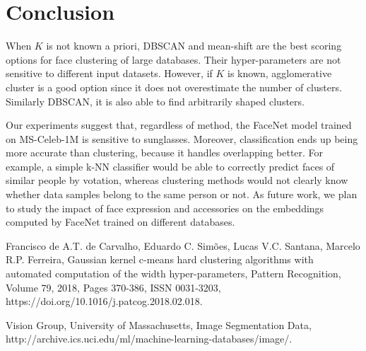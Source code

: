 \documentclass[conference]{IEEEtran}
\begin{document}
\section{Conclusion}

When $K$ is not known a priori, DBSCAN and mean-shift are the best scoring options for face clustering of large databases.
Their hyper-parameters are not sensitive to different input datasets.
However, if $K$ is known, agglomerative cluster is a good option since it does not overestimate the number of clusters.
Similarly DBSCAN, it is also able to find arbitrarily shaped clusters.

Our experiments suggest that, regardless of method, the FaceNet model trained on MS-Celeb-1M is sensitive to sunglasses.
Moreover, classification ends up being more accurate than clustering, because it handles overlapping better.
For example, a simple k-NN classifier would be able to correctly predict faces of similar people by votation, whereas clustering methods would not clearly know whether data samples belong to the same person or not.
As future work, we plan to study the impact of face expression and accessories on the embeddings computed by FaceNet trained on different databases.

\begin{thebibliography}{00}
 Francisco de A.T. de Carvalho, Eduardo C. Simões, Lucas V.C. Santana, Marcelo R.P. Ferreira,
Gaussian kernel c-means hard clustering algorithms with automated computation of the width hyper-parameters,
Pattern Recognition,
Volume 79,
2018,
Pages 370-386,
ISSN 0031-3203,
https://doi.org/10.1016/j.patcog.2018.02.018.

 Vision Group, University of Massachusetts, 
Image Segmentation Data,
http://archive.ics.uci.edu/ml/machine-learning-databases/image/.

\end{thebibliography}
\end{document}
